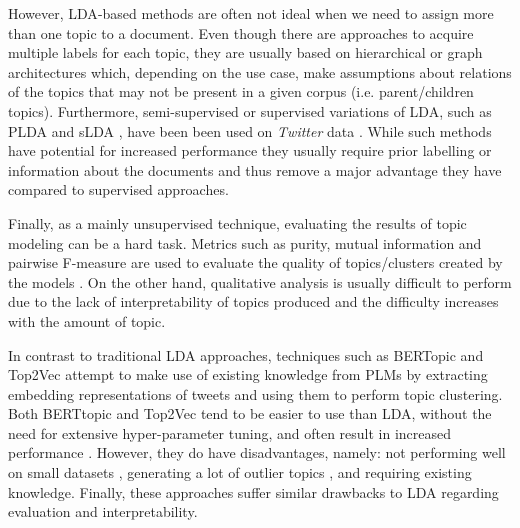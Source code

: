 However, \ac{LDA}-based methods are often not ideal when we need to assign more than one topic to a document. Even though there are approaches to acquire multiple labels for each topic, they are usually based on hierarchical \cite{griffiths2003hierarchical} or graph \cite{li2006pachinko} architectures which, depending on the use case, make assumptions about relations of the topics that may not be present in a given corpus (i.e. parent/children topics). Furthermore, semi-supervised or supervised variations of \ac{LDA}, such as PLDA \cite{ramage2011partially} and sLDA \cite{mcauliffe2007supervised}, have been been used on \textit{Twitter} data \cite{resnik2015beyond, ashktorab2014tweedr}. While such methods have potential for increased performance they usually require prior labelling or information about the documents and thus remove a major advantage they have compared to supervised approaches. 

Finally, as a mainly unsupervised technique, evaluating the results of topic modeling can be a hard task. Metrics such as purity, mutual information and pairwise F-measure are used to evaluate the quality of topics/clusters created by the models \cite{nugroho2020survey}. On the other hand, qualitative analysis is usually difficult to perform due to the lack of interpretability of topics produced and the difficulty increases with the amount of topic.

In contrast to traditional \ac{LDA} approaches, techniques such as BERTopic \cite{bertopic} and Top2Vec \cite{angelov2020top2vec} attempt to make use of existing knowledge from \acp{PLM} by extracting embedding representations of tweets and using them to perform topic clustering. Both BERTtopic and Top2Vec tend to be easier to use than \ac{LDA}, without the need for extensive hyper-parameter tuning, and often result in increased performance \cite{egger2022topic}. However, they do have disadvantages, namely: not performing well on small datasets \cite{abuzayed2021bert}, generating a lot of outlier topics \cite{silveira2021topic}, and requiring existing knowledge. Finally, these approaches suffer similar drawbacks to \ac{LDA} regarding evaluation and interpretability.

